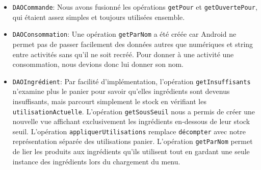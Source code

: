 \documentclass[a4paper,10pt]{article}
\begin{document}
\begin{itemize}
    \item \texttt{DAOCommande}: Nous avons fusionné les opérations \texttt{getPour} et \texttt{getOuvertePour}, qui étaient assez simples et toujours utilisées ensemble.
    \item \texttt{DAOConsommation}: Une opération \texttt{getParNom} a été créée car Android ne permet pas de passer facilement des données autres que numériques et string entre activités sans qu'il ne soit recréé. Pour donner à une activité une consommation, nous devions donc lui donner son nom.
    \item \texttt{DAOIngrédient}: Par facilité d'implémentation, l'opération \texttt{getInsuffisants} n'examine plus le panier pour savoir qu'elles ingrédients sont devenus insuffisants, mais parcourt simplement le stock en vérifiant les \texttt{utilisationActuelle}. L'opération \texttt{getSousSeuil} nous a permis de créer une nouvelle vue affichant exclusivement les ingrédients en-dessous de leur stock seuil. L'opération \texttt{appliquerUtilisations} remplace \texttt{décompter} avec notre représentation séparée des utilisations panier. L'opération \texttt{getParNom} permet de lier les produits aux ingrédients qu'ils utilisent tout en gardant une seule instance des ingrédients lors du chargement du menu.
\end{itemize}
\end{document}
